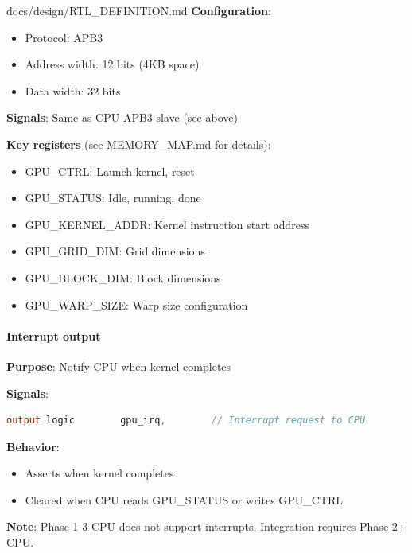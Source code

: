 \begin{relocated}{docs/design/RTL_DEFINITION.md}
\textbf{Configuration}:

\begin{itemize}
\tightlist
\item
  Protocol: APB3
\item
  Address width: 12 bits (4KB space)
\item
  Data width: 32 bits
\end{itemize}

\textbf{Signals}: Same as CPU APB3 slave (see above)

\textbf{Key registers} (see MEMORY\_\allowbreak{}MAP.md for details):

\begin{itemize}
\tightlist
\item
  GPU\_CTRL: Launch kernel, reset
\item
  GPU\_\allowbreak{}STATUS: Idle, running, done
\item
  GPU\_\allowbreak{}KERNEL\_\allowbreak{}ADDR: Kernel instruction start
  address
\item
  GPU\_\allowbreak{}GRID\_\allowbreak{}DIM: Grid dimensions
\item
  GPU\_\allowbreak{}BLOCK\_\allowbreak{}DIM: Block dimensions
\item
  GPU\_\allowbreak{}WARP\_\allowbreak{}SIZE: Warp size configuration
\end{itemize}

\paragraph{Interrupt output}\label{ds:ch:rtl-definition:interrupt-output}

\textbf{Purpose}: Notify CPU when kernel completes

\textbf{Signals}:

\begin{lstlisting}[language=Verilog]
output logic        gpu_irq,        // Interrupt request to CPU
\end{lstlisting}

\textbf{Behavior}:

\begin{itemize}
\tightlist
\item
  Asserts when kernel completes
\item
  Cleared when CPU reads GPU\_\allowbreak{}STATUS or writes GPU\_CTRL
\end{itemize}

\textbf{Note}: Phase 1-3 CPU does not support interrupts. Integration
requires Phase 2+ CPU.


\end{relocated}
